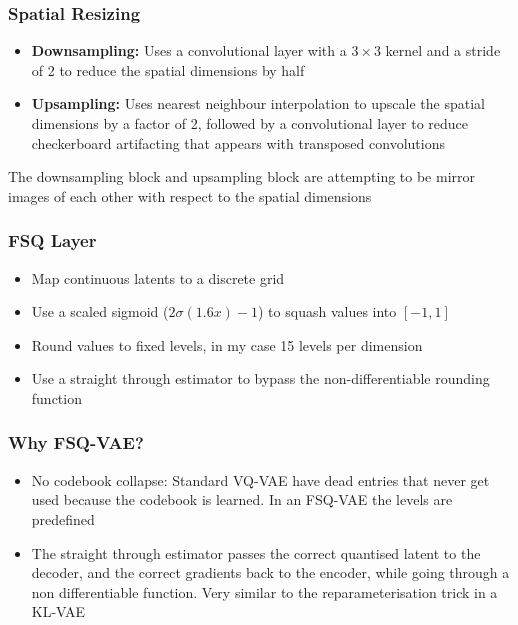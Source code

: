 \documentclass{beamer}
\begin{document}
\begin{frame}
    \frametitle{Spatial Resizing}
    \begin{itemize}
        \setlength{\itemsep}{1em}
        \item \textbf{Downsampling:} Uses a convolutional layer with a $3\times 3$ kernel and a stride of 2 to reduce the spatial dimensions by half
        \item \textbf{Upsampling:} Uses nearest neighbour interpolation to upscale the spatial dimensions by a factor of 2, followed by a convolutional layer to reduce checkerboard artifacting that appears with transposed convolutions
    \end{itemize}

    The downsampling block and upsampling block are attempting to be mirror images of each other with respect to the spatial dimensions
\end{frame}

\begin{frame}
    \frametitle{FSQ Layer}
    \begin{itemize}
        \setlength{\itemsep}{1em}
        \item Map continuous latents to a discrete grid
        \item Use a scaled sigmoid ($2\sigma(1.6x)-1$) to squash values into $[-1,1]$
        \item Round values to fixed levels, in my case 15 levels per dimension
        \item Use a straight through estimator to bypass the non-differentiable rounding function
    \end{itemize}
\end{frame}

\begin{frame}
    \frametitle{Why FSQ-VAE?}
    \begin{itemize}
        \setlength{\itemsep}{1em}
        \item No codebook collapse: Standard VQ-VAE have dead entries that never get used because the codebook is learned. In an FSQ-VAE the levels are predefined
        \item The straight through estimator passes the correct quantised latent to the decoder, and the correct gradients back to the encoder, while going through a non differentiable function. Very similar to the reparameterisation trick in a KL-VAE
    \end{itemize}
\end{frame}
\end{document}

